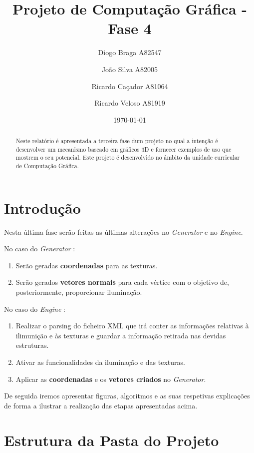 \documentclass[a4paper]{article}
\title{Projeto de Computação Gráfica - Fase 4}
\author{Diogo Braga A82547 \and João Silva A82005 \and Ricardo Caçador A81064
\and Ricardo Veloso A81919}
\date{\today}
\begin{document}
\maketitle

\begin{abstract}
Neste relatório é apresentada a terceira fase dum projeto no qual a intenção é desenvolver um mecanismo baseado em gráficos 3D e fornecer exemplos de uso que mostrem o seu potencial. Este projeto é desenvolvido no âmbito da unidade curricular de Computação Gráfica.
\end{abstract}

\newpage

\tableofcontents


\newpage

\section{Introdução}
\label{sec:intro}

Nesta última fase serão feitas as últimas alterações no \textit{Generator} e no \textit{Engine}.


No caso do \textit{Generator} :

\begin{enumerate}
	\item Serão geradas \textbf{coordenadas} para as texturas.
	\item Serão gerados \textbf{vetores normais} para cada vértice com o objetivo de, posteriormente, proporcionar iluminação.
\end{enumerate}

No caso do \textit{Engine} :

\begin{enumerate}
	\item Realizar o parsing do ficheiro XML que irá conter as informações relativas à ilimunição e às texturas e guardar a informação retirada nas devidas estruturas.
	\item Ativar as funcionalidades da iluminação e das texturas.
	\item Aplicar as \textbf{coordenadas} e os \textbf{vetores criados} no \textit{Generator}.
\end{enumerate}

De seguida iremos apresentar figuras, algoritmos e as suas respetivas explicações de forma a ilustrar a realização das etapas apresentadas acima.

\section{Estrutura da Pasta do Projeto}
\label{sec:estrutura}
\end{document}
